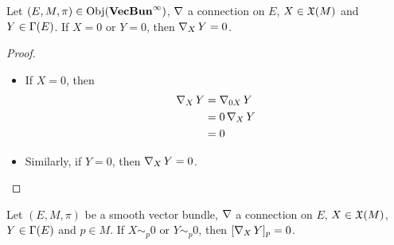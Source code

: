 \documentclass{book}
\begin{document}
	\begin{ex}
		Let $(E, M, \pi) \in \operatorname{Obj}(\operatorname*{\text{\textbf{VecBun}}^{\infty}})$, $\operatorname{\nabla}$ a connection on $E$, $X \in \mathfrak{X}(M)$ and $Y \in \Gamma(E)$. If $X = 0$ or $Y = 0$, then $\operatorname{\nabla}_X Y = 0$.
	\end{ex}

	\begin{proof}\
		\begin{itemize}
			\item If $X = 0$, then 
			\begin{align*}
				\operatorname{\nabla}_X Y
				& = \operatorname{\nabla}_{0 X} Y \\
				& = 0 \operatorname{\nabla}_X Y \\
				& = 0
			\end{align*}
			\item Similarly, if $Y = 0$, then $\operatorname{\nabla}_X Y = 0$.
		\end{itemize}
	\end{proof}

	\begin{ex}
		Let $(E, M, \pi)$ be a smooth vector bundle, $\operatorname{\nabla}$ a connection on $E$, $X \in \mathfrak{X}(M)$, $Y \in \Gamma(E)$ and $p \in M$. If $X \sim_p 0$ or $Y \sim_p 0$, then $[\operatorname{\nabla}_{X}Y]_p = 0$.
	\end{ex}
\end{document}
